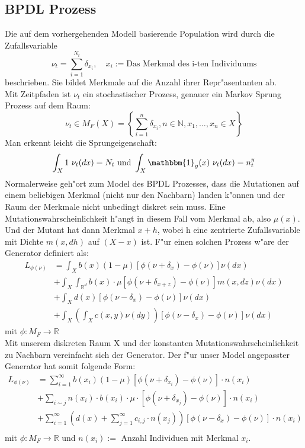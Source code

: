 \documentclass[11pt, a4paper, german]{article}
\begin{document}
	\subsection{BPDL Prozess}
	Die auf dem vorhergehenden Modell basierende Population wird durch die Zufallsvariable
	\[ \nu_t = \sum_{i=1}^{N_t} \delta_{x_i}, \quad x_i := \text{Das Merkmal des i-ten Individuums} \]
	beschrieben. Sie bildet Merkmale auf die Anzahl ihrer Repr"asentanten ab.\\
	Mit Zeitpfaden ist $ \nu_t $ ein stochastischer Prozess, genauer ein Markov Sprung Prozess auf dem Raum:
	\[ \nu_t \in M_F(X) = \left\{ \sum_{i=1}^{n} \delta_{x_i}, n \in \mathbb{N}, x_1, \dots, x_n \in X \right\} \]
	Man erkennt leicht die Sprungeigenschaft:
	\[ \int_X 1 \text{ } \nu_t(dx) = N_t 
	\text{ und }
	\int_X \mathbbm{1}_y(x) \text{ } \nu_t(dx) = n_t^{y} \]
	Normalerweise geh"ort zum Model des BPDL Prozesses, dass die Mutationen auf einem beliebigen Merkmal (nicht nur den Nachbarn) landen k"onnen und der Raum der Merkmale nicht unbedingt diskret sein muss. Eine Mutationswahrscheinlichkeit h"angt in diesem Fall vom Merkmal ab, also $ \mu(x) $. Und der Mutant hat dann Merkmal $ x + h $, wobei h eine zentrierte Zufallsvariable mit Dichte $ m(x,dh) $ auf $ (X - x) $ ist.
	F"ur einen solchen Prozess w"are der Generator definiert als:
	\begin{align*}
		L_{\phi(\nu)} &= \int_{X} b(x)(1-\mu)[\phi(\nu + \delta_x) - \phi(\nu)]\nu(dx)\\
					  &+ \int_{X}\int_{\mathbb{R}^d} b(x) \cdot \mu [\phi(\nu + \delta_{x+z}) - \phi(\nu)] m(x,dz) \nu(dx)\\
				  	  &+ \int_{X} d(x)[\phi(\nu - \delta_x) - \phi(\nu)]\nu(dx)\\
				 	  &+ \int_{X} \left( \int_{X} c(x,y) \nu(dy) \right) [\phi(\nu - \delta_x) - \phi(\nu)]\nu(dx)
	\end{align*}
	mit $ \phi: M_F \to \mathbb{R} $\\
	Mit unserem diskreten Raum X und der konstanten Mutationswahrscheinlichkeit zu Nachbarn vereinfacht sich der Generator. Der f"ur unser Model angepasster Generator hat somit folgende Form:
	\begin{align*}
		L_{\phi(\nu)} &= \sum_{i = 1}^{\infty} b(x_i)(1-\mu)[\phi(\nu + \delta_{x_i}) - \phi(\nu)] \cdot n(x_i)\\
		&+ \sum_{i \sim j} n(x_i) \cdot b(x_i) \cdot \mu \cdot 
		 [\phi(\nu + \delta_{x_j}) - \phi(\nu)] \cdot n(x_i)\\		 
		&+ \sum_{i = 1}^{\infty} (d(x) + \sum_{j = 1}^{\infty} c_{i,j} \cdot n(x_j))[\phi(\nu - \delta_x) - \phi(\nu)] \cdot n(x_i)\\
	\end{align*}
	mit $ \phi: M_F \to \mathbb{R} $ und $ n(x_i) := $ Anzahl Individuen mit Merkmal $ x_i $.\\	
\end{document}
